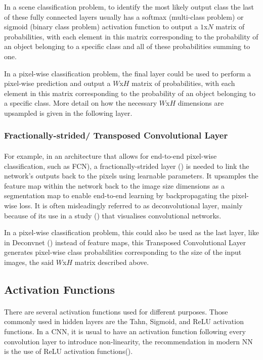 In a scene classification problem, to identify the most likely output class the last of these fully connected layers usually has a softmax (multi-class problem) or sigmoid (binary class problem) activation function to output a $1$x$N$ matrix of probabilities, with each element in this matrix corresponding to the probability of an object belonging to a specific class and all of these probabilities summing to one.

In a pixel-wise classification problem, the final layer could be used to perform a pixel-wise prediction and output a $W$x$H$ matrix of probabilities, with each element in this matrix corresponding to the probability of an object belonging to a specific class. More detail on how the necessary $W$x$H$ dimensions are upsampled is given in the following layer.

\subsubsection{Fractionally-strided/ Transposed Convolutional Layer}
\paragraph{}
For example, in an architecture that allows for end-to-end pixel-wise classification, such as \gls{FCN}), a fractionally-strided layer (\cite{long2015fully}) is needed to link the network's outputs back to the pixels using learnable parameters. It upsamples the feature map within the network back to the image size dimensions as a segmentation map to enable end-to-end learning by backpropagating the pixel-wise loss. It is often misleadingly referred to as deconvolutional layer, mainly because of its use in a study (\cite{zeiler2013visualizing}) that visualises convolutional networks. 

In a pixel-wise classification problem, this could also be used as the last layer, like in Deconvnet (\cite{7410535}) instead of feature maps, this Transposed Convolutional Layer generates pixel-wise class probabilities corresponding to the size of the input images, the said $W$x$H$ matrix described above.

\subsection{Activation Functions} \label{cnn_activation}
\paragraph{}
There are several activation functions used for different purposes. Those commonly used in hidden layers are the Tahn, Sigmoid, and \gls{ReLU} activation functions.
In a \gls{CNN}, it is usual to have an activation function following every convolution layer to introduce non-linearity, the recommendation in modern \gls{NN} is the use of \gls{ReLU} activation functions(\cite{GoodBengCour16}).

